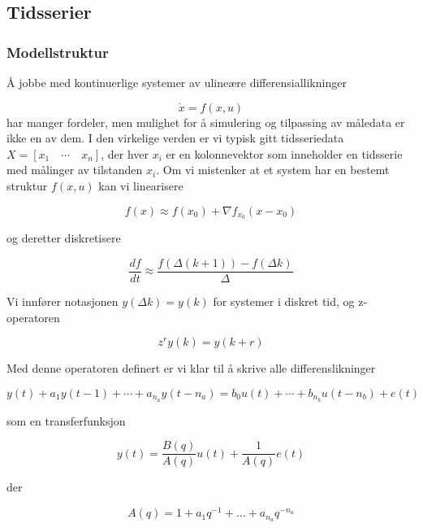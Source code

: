 \subsection{Tidsserier}
\subsubsection{Modellstruktur}
Å jobbe med kontinuerlige systemer av ulineære differensiallikninger

\begin{equation}
	\dot{x} = f(x, u)
\end{equation}
har manger fordeler, men mulighet for å simulering og tilpassing av måledata er ikke en av dem. I den virkelige verden er vi typisk gitt tidsseriedata $X = [x_1 \quad \cdots \quad x_n]$, der hver $x_i$ er en kolonnevektor som inneholder en tidsserie med målinger av tilstanden $x_i$. Om vi mistenker at et system har en bestemt struktur $f(x, u)$ kan vi linearisere

\begin{equation}
	f(x) \approx f(x_0) + \nabla f_{x_0} (x - x_0)
\end{equation}

og deretter diskretisere

\begin{equation}
	\frac{df}{dt} \approx \frac{f(\Delta (k+1)) - f(\Delta k)}{\Delta}
\end{equation}

Vi innfører notasjonen $y(\Delta k) = y(k)$ for systemer i diskret tid, og z-operatoren

\begin{equation}
	z^r y(k) = y(k + r)
\end{equation}

Med denne operatoren definert er vi klar til å skrive alle differenslikninger

\begin{equation}
	y(t) + a_1 y(t-1) + \cdots + a_{n_a} y(t - n_a) = b_0 u(t) + \cdots + b_{n_b} u(t - n_b) + e(t)
\end{equation}

som en transferfunksjon

\begin{equation}
y(t) = \frac{B(q)}{A(q)} u(t) + \frac{1}{A(q)}e(t)
\end{equation}

der 

\begin{equation}
	A(q)=1+a_{1} q^{-1}+\ldots+a_{n_{a}} q^{-n_{a}}
\end{equation}

